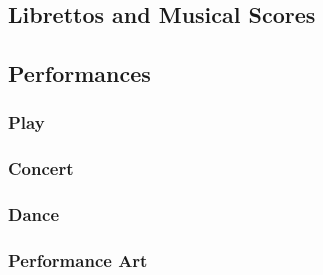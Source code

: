 \documentclass{ltxdockit}
\begin{document}
\subsection{Librettos and Musical Scores} %
\label{sec:librettos_and_musical_scores}
\begin{refsection}
	\printbibliography[heading=none]
\end{refsection}

\subsection{Performances} %
\label{sec:performances}
\subsubsection{Play} %
\label{sub:play_performance}
\begin{refsection}
	\printbibliography[heading=none]
\end{refsection}
\subsubsection{Concert} %
\label{sub:concert}
\begin{refsection}
	\printbibliography[heading=none]
\end{refsection}
\subsubsection{Dance} %
\label{sub:dance}
\begin{refsection}
	\printbibliography[heading=none]
\end{refsection}
\subsubsection{Performance Art} %
\label{sub:performance_art}
\begin{refsection}
	\printbibliography[heading=none]
\end{refsection}

\end{document}
